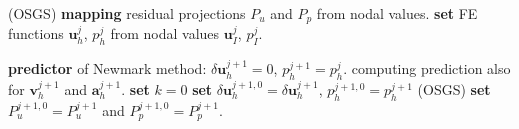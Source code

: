 \documentclass[11pt,english]{article}
\begin{document}
\begin{algorithm}[h!]
\begin{algorithmic}[1]
          (OSGS)
        \State \textbf{mapping} residual projections $P_u$ and $P_p$ from nodal values. 
        \EndIf
            \State \textbf{set} FE functions $\boldsymbol{u}^{j}_h$, $p^{j}_h$ from nodal values $\boldsymbol{u}^{j}_I$, $p^{j}_I$.
        
        \State \textbf{predictor} of Newmark method: 
        \State \hspace{\algorithmicindent} $\delta \boldsymbol{u}^{j+1}_h=0$, $p^{j+1}_h=p^{j}_h$. 
        \State \hspace{\algorithmicindent} computing prediction also for $\boldsymbol{v}^{j+1}_h$ and $\boldsymbol{a}^{j+1}_h$.
        \State {}
        \State \textbf{set} $k=0$ 
        \State \textbf{set} $\delta \boldsymbol{u}^{j+1,0}_h=\delta \boldsymbol{u}^{j+1}_h$,  $p^{j+1,0}_h=p^{j+1}_h$
         (OSGS)
        \State \textbf{set} $P^{j+1,0}_u=P^{j+1}_u$ and $P^{j+1,0}_p=P^{j+1}_p$. 
        \EndIf



\end{algorithmic}
\end{algorithm}
\end{document}
